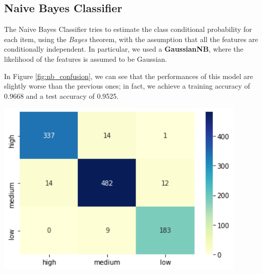 \subsection{Naive Bayes Classifier}
\begin{minipage}{0.59\textwidth}
\vspace{-13mm}
The Naive Bayes Classifier tries to estimate the class conditional probability for each item, using the \emph{Bayes} theorem, with the assumption that all the features are conditionally independent. In particular, we used a \textbf{GaussianNB}, where the likelihood of the features is assumed to be Gaussian.

In Figure \ref{fig:nb_confusion}, we can see that the performances of this model are slightly worse than the previous ones; in fact, we achieve a training accuracy of 0.9668 and a test accuracy of 0.9525.  
\end{minipage}
\begin{minipage}{0.4\textwidth}
\centering
\includegraphics[width=0.90\textwidth]{img/classification/nb_confusion.png}
\captionsetup{justification=centering}
\label{fig:nb_confusion}
\end{minipage}

